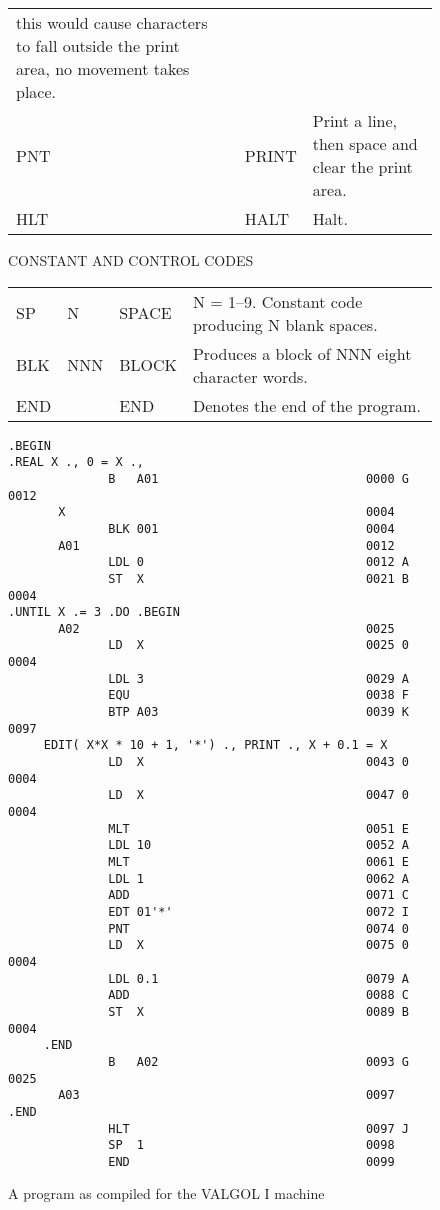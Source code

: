 \documentclass[notitlepage,twocolumn]{report}
\begin{document}
\begin{figure}
\begin{tabular}{lllp{7cm}}
                        this would cause characters to fall outside
                        the print area, no movement takes place. \\
  PNT & & PRINT & Print a line, then space and clear the print
                  area. \\
  HLT & & HALT & Halt. \\
\end{tabular}
\begin{center}
CONSTANT AND CONTROL CODES
\end{center}
\begin{tabular}{lllp{7cm}}
  SP & N & SPACE & N = 1--9. Constant code producing N blank
                   spaces. \\
  BLK & NNN & BLOCK & Produces a block of NNN eight character
                      words. \\
  END & & END & Denotes the end of the program. \\
\end{tabular}
\end{figure}


\begin{figure}
\caption{A program as compiled for the VALGOL I machine}
\label{valgol-1-example}
\begin{verbatim}
.BEGIN
.REAL X ., 0 = X .,
              B   A01                             0000 G 0012
       X                                          0004
              BLK 001                             0004
       A01                                        0012
              LDL 0                               0012 A
              ST  X                               0021 B 0004
.UNTIL X .= 3 .DO .BEGIN
       A02                                        0025
              LD  X                               0025 0 0004
              LDL 3                               0029 A
              EQU                                 0038 F
              BTP A03                             0039 K 0097
     EDIT( X*X * 10 + 1, '*') ., PRINT ., X + 0.1 = X
              LD  X                               0043 0 0004
              LD  X                               0047 0 0004
              MLT                                 0051 E
              LDL 10                              0052 A
              MLT                                 0061 E
              LDL 1                               0062 A
              ADD                                 0071 C
              EDT 01'*'                           0072 I
              PNT                                 0074 0
              LD  X                               0075 0 0004
              LDL 0.1                             0079 A
              ADD                                 0088 C
              ST  X                               0089 B 0004
     .END
              B   A02                             0093 G 0025
       A03                                        0097
.END
              HLT                                 0097 J
              SP  1                               0098
              END                                 0099
\end{verbatim}
\end{figure}
\end{document}
